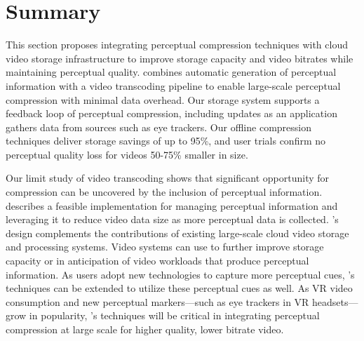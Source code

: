 \section{Summary}
This section proposes integrating perceptual compression techniques with cloud video storage infrastructure to improve storage capacity and video bitrates while maintaining perceptual quality.
\name combines automatic generation of perceptual information with a video transcoding pipeline to enable large-scale perceptual compression with minimal data overhead.
Our storage system supports a feedback loop of perceptual compression, including updates as an application gathers data from sources such as eye trackers.
Our offline compression techniques deliver storage savings of up to 95\%, and user trials confirm no perceptual quality loss for \name videos 50-75\% smaller in size.

Our limit study of video transcoding shows that significant opportunity for compression can be uncovered by the inclusion of perceptual information.
\name describes a feasible implementation for managing perceptual information and leveraging it to reduce video data size as more perceptual data is collected.
\name's design complements the contributions of existing large-scale cloud video storage and processing systems.
Video systems can use \name to further improve storage capacity or in anticipation of video workloads that produce perceptual information.
As users adopt new technologies to capture more perceptual cues, \name's techniques can be extended to utilize these perceptual cues as well.
As VR video consumption and new perceptual markers---such as eye trackers in VR headsets---grow in popularity, \name's techniques will be critical in integrating perceptual compression at large scale for higher quality, lower bitrate video. %
